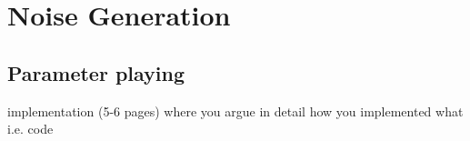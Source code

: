 \newpage
\section{Noise Generation}
\subsection{Parameter playing}

implementation (5-6 pages) where you argue in detail how you implemented what i.e. code